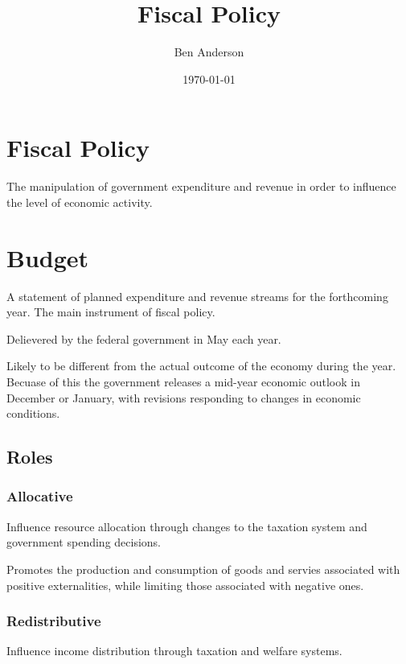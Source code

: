 \documentclass[a4paper,11pt]{article}
\begin{document}
\title{Fiscal Policy}
\author{Ben Anderson}
\date{\today}
\maketitle
\pagebreak

\tableofcontents
\pagebreak


\section{Fiscal Policy}

The manipulation of government expenditure and revenue in order to influence the
level of economic activity.



\section{Budget}

A statement of planned expenditure and revenue streams for the forthcoming year.
The main instrument of fiscal policy.

Delievered by the federal government in May each year.

Likely to be different from the actual outcome of the economy during the year.
Becuase of this the government releases a mid-year economic outlook in December
or January, with revisions responding to changes in economic conditions.

\subsection{Roles}

\subsubsection{Allocative}

Influence resource allocation through changes to the taxation system and
government spending decisions.

Promotes the production and consumption of goods and servies associated with
positive externalities, while limiting those associated with negative ones.

\subsubsection{Redistributive}

Influence income distribution through taxation and welfare systems.
\end{document}
